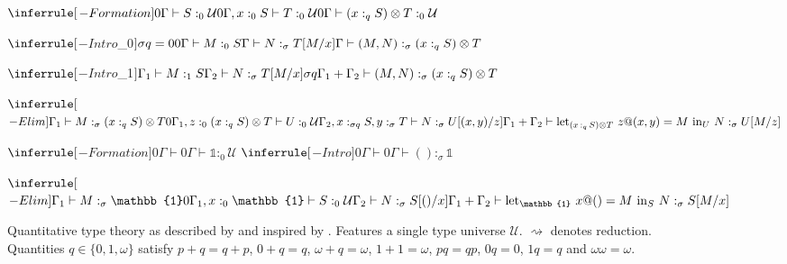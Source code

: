 \begin{mdframed}
\begin{figure}[H]
\begin{mathpar}
	\end{mathpar}
\end{figure}
\begin{figure}[H]
	\begin{mathpar}
		$\inferrule[$\otimes$-Formation]{0\Gamma \vdash S :_0 \mathcal{U} \\ 0\Gamma, x :_0 S \vdash T :_0 \mathcal{U}}{0\Gamma \vdash (x :_q S) \otimes T :_0 \mathcal{U}}$
	\end{mathpar}
	\begin{mathpar}
		$\inferrule[$\otimes$-Intro$_0$]{\sigma q = 0 \\ 0\Gamma \vdash M :_0 S \\ \Gamma \vdash N :_\sigma T[M/x]}{\Gamma \vdash (M, N) :_\sigma (x :_q S) \otimes T}$
	\end{mathpar}
	\begin{mathpar}
		$\inferrule[$\otimes$-Intro$_1$]{\Gamma_1 \vdash M :_1 S \\ \Gamma_2 \vdash N :_\sigma T[M/x]}{\sigma q \Gamma_1 + \Gamma_2 \vdash (M, N) :_\sigma (x :_q S) \otimes T}$
	\end{mathpar}
	\begin{mathpar}
		$\inferrule[$\otimes$-Elim]{\Gamma_1 \vdash M :_\sigma (x :_q S) \otimes T \\ 0\Gamma_1, z :_0 (x :_q S) \otimes T \vdash U :_0 \mathcal{U} \\ \Gamma_2, x :_{\sigma q} S, y :_\sigma T \vdash N :_\sigma U[(x, y)/z]}{\Gamma_1 + \Gamma_2 \vdash \mathrm{let}_{(x\,:_q\,S) \otimes T}\ z@(x, y) = M\ \mathrm{in}_U\ N :_\sigma U[M/z]}$
	\end{mathpar}
	\begin{mathpar}
		$\inferrule[$$-Formation]{0\Gamma \vdash}{0\Gamma \vdash \mathbb{1} :_0 \mathcal{U}}$ \hspace{1.5em}
		$\inferrule[$$-Intro]{0\Gamma \vdash}{0\Gamma \vdash () :_\sigma \mathbb{1}}$
	\end{mathpar}
	\begin{mathpar}
		$\inferrule[$$-Elim]{\Gamma_1 \vdash M :_\sigma \mathbb{1} \\ 0\Gamma_1, x :_0 \mathbb{1} \vdash S :_0 \mathcal{U} \\ \Gamma_2 \vdash N :_\sigma S[()/x]}{\Gamma_1 + \Gamma_2 \vdash \mathrm{let}_\mathbb{1}\ x@() = M\ \mathrm{in}_S\ N :_\sigma S[M/x]}$
	\end{mathpar}
	\caption{Quantitative type theory as described by \cite{svoboda_additive_2021} and inspired by \cite{atkey_syntax_2018}. Features a single type universe $\mathcal{U}$. $\rightsquigarrow$ denotes reduction. Quantities $q \in \{0, 1, \omega\}$ satisfy $p + q = q + p$, $0 + q = q$, $\omega + q = \omega$, $1 + 1 = \omega$, $p q = q p$, $0q = 0$, $1q = q$ and $\omega \omega = \omega$.}
	\label{fig:qtt}
\end{figure}
\end{mdframed}
\FloatBarrier
\clearpage

